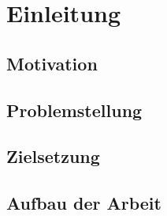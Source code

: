 \section{Einleitung}
\subsection{Motivation}
\subsection{Problemstellung}
\subsection{Zielsetzung}
\subsection{Aufbau der Arbeit}